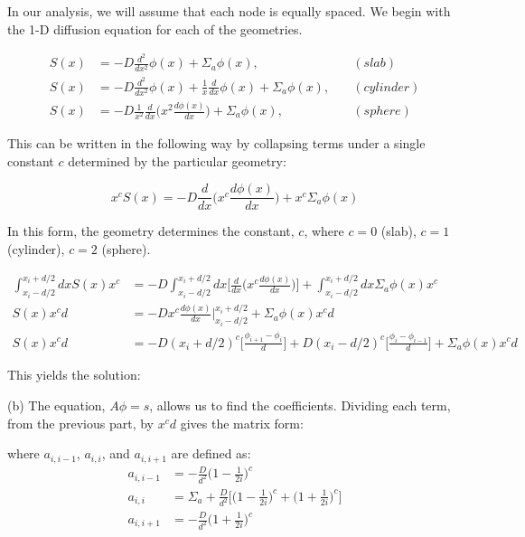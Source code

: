 \documentclass{amsart}
\theoremstyle{definition}
\begin{document}
In our analysis, we will assume that each node is equally spaced.
We begin with the 1-D diffusion equation for each of the geometries.


\begin{align*}
    S(x) &= -D\frac{d^2}{dx^2}\phi(x) + \Sigma_a\phi(x), \quad &(slab)  \\
    S(x) &= -D\frac{d^2}{dx^2}\phi(x) + \frac{1}{x}\frac{d}{dx}\phi(x) +\Sigma_a\phi(x), \quad &(cylinder) \\
    S(x) &= -D\frac{1}{x^2}\frac{d}{dx}\bigg(x^2 \frac{d\phi(x)}{dx}\bigg) +\Sigma_a\phi(x), \quad &(sphere)
\end{align*}


This can be written in the following way by collapsing terms under a single constant $c$ determined by the particular geometry:

\begin{equation*}
    x^c S(x) = -D\frac{d}{dx}\bigg(x^c\frac{d\phi(x)}{dx}\bigg)+x^c\Sigma_a\phi(x)
\end{equation*}



In this form, the geometry determines the constant, $c$, where $c=0$ (slab), $c=1$ (cylinder), $c=2$ (sphere).

\begin{align*}
    \int_{x_i-d/2}^{x_i+d/2}dxS(x)x^c  &= -D\int_{x_i-d/2}^{x_i+d/2}dx\bigg[\frac{d}{dx}\bigg(x^c\frac{d\phi(x)}{dx}\bigg)\bigg]+\int_{x_i-d/2}^{x_i+d/2}dx \Sigma_a\phi(x)x^c \\
    S(x)x^cd &= -Dx^c\frac{d\phi(x)}{dx}\Biggr|_{x_i-d/2}^{x_i+d/2}+\Sigma_a\phi(x)x^cd \\
    S(x)x^cd &= -D(x_i+d/2)^c\bigg[\frac{\phi_{i+1}-\phi_i}{d}\bigg]+D(x_i-d/2)^c\bigg[\frac{\phi_i-\phi_{i-1}}{d}\bigg]+\Sigma_a\phi(x)x^cd
\end{align*}
\bigbreak



This yields the solution:


(b) The equation, $A\phi = s$, allows us to find the coefficients.
Dividing each term, from the previous part, by $x^cd$ gives the matrix form:
\bigbreak

\bigbreak

where $a_{i,i-1}$, $a_{i,i}$, and $a_{i,i+1}$ are defined as:
\begin{align*}
    a_{i,i-1} &= -\frac{D}{d^2}\bigg(1-\frac{1}{2i}\bigg)^c \\
    a_{i,i} &= \Sigma_a+\frac{D}{d^2}\bigg[\bigg(1-\frac{1}{2i}\bigg)^c+ \bigg(1+\frac{1}{2i}\bigg)^c\bigg] \\
    a_{i,i+1} &= -\frac{D}{d^2}\bigg(1+\frac{1}{2i}\bigg)^c
\end{align*}
\bigbreak
\end{document}
